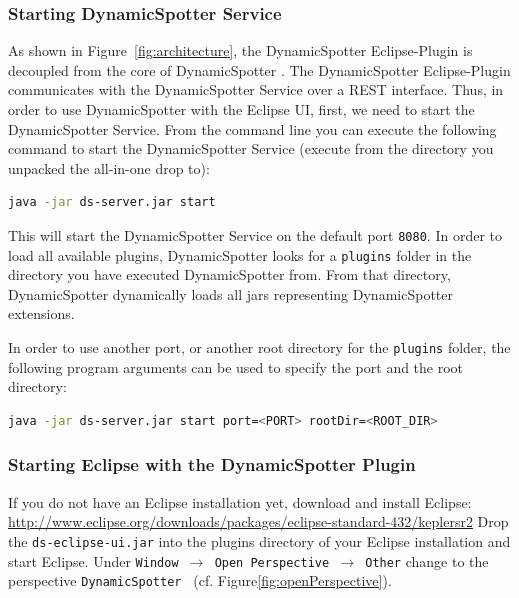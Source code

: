 \documentclass{report}
\newcommand{\DS}{DynamicSpotter }
\newcommand{\link}[1]{\textcolor[rgb]{0.0,0.0,1.0}{\href{#1}{#1}}}
\begin{document}
\subsubsection{Starting \DS Service}
As shown in Figure~\ref{fig:architecture}, the \DS Eclipse-Plugin is decoupled from the core of \DS.
The \DS Eclipse-Plugin communicates with the \DS Service over a REST interface.
Thus, in order to use \DS with the Eclipse UI, first, we need to start the \DS Service.
From the command line you can execute the following command to start the \DS Service (execute from the directory you
unpacked the all-in-one drop to):
\begin{lstlisting}[language=sh,morekeywords={java,javaagent,\-jar}, frame=single]
java -jar ds-server.jar start
\end{lstlisting}
This will start the \DS Service on the default port \texttt{8080}. In order to load all available plugins, \DS looks
for a \texttt{plugins} folder in the directory you have executed \DS from. From that directory, \DS dynamically loads
all jars representing \DS extensions.

In order to use another port, or another root directory for the \texttt{plugins} folder, the following program arguments
can be used to specify the port and the root directory:

\begin{lstlisting}[language=sh,morekeywords={java,javaagent,port, rootDir}, frame=single]
java -jar ds-server.jar start port=<PORT> rootDir=<ROOT_DIR>
\end{lstlisting}

\subsubsection{Starting Eclipse with the \DS Plugin}
If you do not have an Eclipse installation yet, download and install Eclipse:
\newline
\newline
\link{http://www.eclipse.org/downloads/packages/eclipse-standard-432/keplersr2}
\newline
\newline
Drop the \texttt{ds-eclipse-ui.jar} into the plugins directory of your Eclipse installation and start Eclipse.
Under \texttt{Window \(\rightarrow\) Open Perspective \(\rightarrow\) Other} change to the perspective \texttt{\DS} (cf.
Figure\ref{fig:openPerspective}).
\end{document}
